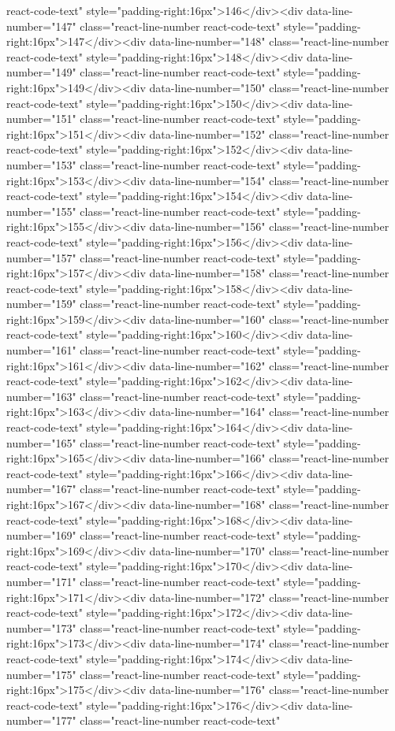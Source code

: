 {{{{{react-code-text" style="padding-right:16px">146</div><div data-line-number="147" class="react-line-number react-code-text" style="padding-right:16px">147</div><div data-line-number="148" class="react-line-number react-code-text" style="padding-right:16px">148</div><div data-line-number="149" class="react-line-number react-code-text" style="padding-right:16px">149</div><div data-line-number="150" class="react-line-number react-code-text" style="padding-right:16px">150</div><div data-line-number="151" class="react-line-number react-code-text" style="padding-right:16px">151</div><div data-line-number="152" class="react-line-number react-code-text" style="padding-right:16px">152</div><div data-line-number="153" class="react-line-number react-code-text" style="padding-right:16px">153</div><div data-line-number="154" class="react-line-number react-code-text" style="padding-right:16px">154</div><div data-line-number="155" class="react-line-number react-code-text" style="padding-right:16px">155</div><div data-line-number="156" class="react-line-number react-code-text" style="padding-right:16px">156</div><div data-line-number="157" class="react-line-number react-code-text" style="padding-right:16px">157</div><div data-line-number="158" class="react-line-number react-code-text" style="padding-right:16px">158</div><div data-line-number="159" class="react-line-number react-code-text" style="padding-right:16px">159</div><div data-line-number="160" class="react-line-number react-code-text" style="padding-right:16px">160</div><div data-line-number="161" class="react-line-number react-code-text" style="padding-right:16px">161</div><div data-line-number="162" class="react-line-number react-code-text" style="padding-right:16px">162</div><div data-line-number="163" class="react-line-number react-code-text" style="padding-right:16px">163</div><div data-line-number="164" class="react-line-number react-code-text" style="padding-right:16px">164</div><div data-line-number="165" class="react-line-number react-code-text" style="padding-right:16px">165</div><div data-line-number="166" class="react-line-number react-code-text" style="padding-right:16px">166</div><div data-line-number="167" class="react-line-number react-code-text" style="padding-right:16px">167</div><div data-line-number="168" class="react-line-number react-code-text" style="padding-right:16px">168</div><div data-line-number="169" class="react-line-number react-code-text" style="padding-right:16px">169</div><div data-line-number="170" class="react-line-number react-code-text" style="padding-right:16px">170</div><div data-line-number="171" class="react-line-number react-code-text" style="padding-right:16px">171</div><div data-line-number="172" class="react-line-number react-code-text" style="padding-right:16px">172</div><div data-line-number="173" class="react-line-number react-code-text" style="padding-right:16px">173</div><div data-line-number="174" class="react-line-number react-code-text" style="padding-right:16px">174</div><div data-line-number="175" class="react-line-number react-code-text" style="padding-right:16px">175</div><div data-line-number="176" class="react-line-number react-code-text" style="padding-right:16px">176</div><div data-line-number="177" class="react-line-number react-code-text" }}}}}
